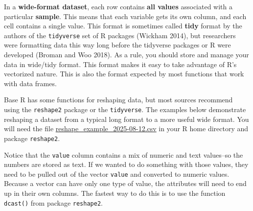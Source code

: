 \documentclass[
  13,
  letterpaper,
]{report}
\newenvironment{Shaded}{\begin{snugshade}}{\end{snugshade}}
\newcommand{\DocumentationTok}[1]{\textcolor[rgb]{0.37,0.37,0.37}{\textit{#1}}}
\newcommand{\FunctionTok}[1]{\textcolor[rgb]{0.28,0.35,0.67}{#1}}
\newcommand{\NormalTok}[1]{\textcolor[rgb]{0.00,0.23,0.31}{#1}}
\newcommand{\OtherTok}[1]{\textcolor[rgb]{0.00,0.23,0.31}{#1}}
\newcommand{\SpecialCharTok}[1]{\textcolor[rgb]{0.37,0.37,0.37}{#1}}
\newcommand{\StringTok}[1]{\textcolor[rgb]{0.13,0.47,0.30}{#1}}
\begin{document}
In a \textbf{wide-format dataset}, each row contains \textbf{all values}
associated with a particular \textbf{sample}. This means that each
variable gets its own column, and each cell contains a single value.
This format is sometimes called \textbf{tidy} format by the authors of
the \texttt{tidyverse} set of R packages (Wickham 2014), but researchers
were formatting data this way long before the tidyverse packages or R
were developed (Broman and Woo 2018). As a rule, you should store and
manage your data in wide/tidy format. This format makes it easy to take
advantage of R's vectorized nature. This is also the format expected by
most functions that work with data frames.

Base R has some functions for reshaping data, but most sources recommend
using the \texttt{reshape2} package or the \texttt{tidyverse}. The
examples below demonstrate reshaping a dataset from a typical long
format to a more useful wide format. You will need the file
\href{https://greenquanteco.github.io/reshape_example_2025-08-12.csv}{reshape\_example\_2025-08-12.csv}
in your R home directory and package \texttt{reshape2}.

\begin{Shaded}
\end{Shaded}

Notice that the \texttt{value} column contains a mix of numeric and text
values--so the numbers are stored as text. If we wanted to do something
with those values, they need to be pulled out of the vector
\texttt{value} and converted to numeric values. Because a vector can
have only one type of value, the attributes will need to end up in their
own columns. The fastest way to do this is to use the function
\texttt{dcast()} from package \texttt{reshape2}.
\end{document}
